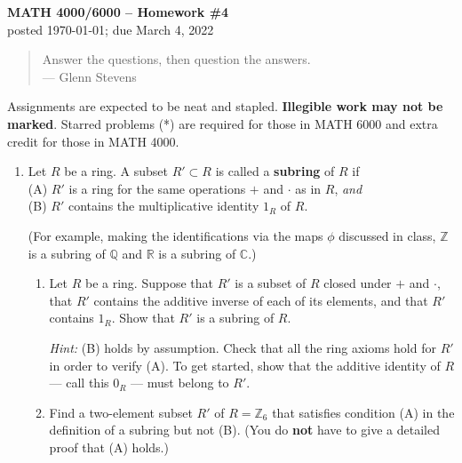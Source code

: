 \documentclass[11pt]{article}
\def\C{\mathbb{C}}
\def\Z{\mathbb{Z}}
\def\Q{\mathbb{Q}}
\def\R{\mathbb{R}}
\theoremstyle{plain}
\theoremstyle{remark}
\begin{document}
\thispagestyle{empty} \begin{center} {\textbf{MATH 4000/6000 --
Homework \#4}\\ posted \today; due March 4, 2022}
\end{center}

\begin{quote} {\scriptsize Answer the questions, then question the answers.\\
--- Glenn Stevens}
\end{quote}

\noindent Assignments are expected to be neat and stapled. \textbf{Illegible work may not be marked}. Starred problems (*) are required for those in MATH 6000 and extra credit for those in MATH 4000.


\begin{enumerate}

\item\label{ex:subring} Let $R$ be a ring. A subset $R' \subset R$ is called a \textbf{subring} of $R$ if\\ (A)  $R'$ is a ring for the same operations
$+$ and $\cdot$ as in $R$, \emph{and}\\
(B) $R'$ contains the multiplicative identity $1_R$ of $R$.

(For example, making the identifications via the maps $\phi$ discussed in class, $\Z$ is a subring of $\Q$ and $\R$ is a subring of $\C$.)

\begin{enumerate}
  \item Let $R$ be a ring. Suppose that $R'$ is a subset of $R$ closed under $+$ and $\cdot$, that $R'$ contains the additive inverse of each of its elements, and that $R'$ contains $1_{R}$. Show that $R'$ is a subring of $R$.

{\scriptsize \emph{Hint:} (B) holds by assumption. Check that all the ring axioms hold for $R'$ in order to verify (A). To get started, show that the additive identity of $R$ --- call this $0_R$ --- must belong to $R'$.}

\item Find a two-element subset $R'$ of $R=\Z_6$ that satisfies condition (A) in the definition of a subring but not (B). (You do \textbf{not} have to give a detailed proof that (A) holds.)
\end{enumerate}



\end{enumerate}
\end{document}
